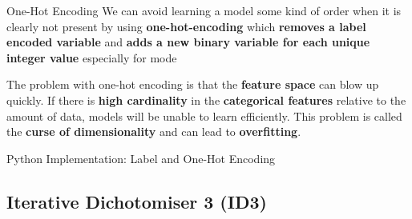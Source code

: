 \documentclass[document.tex]{subfiles}
\begin{document}
    \begin{frame}{One-Hot Encoding}
        We can avoid learning a model some kind of order when it is clearly not present by using \textbf{one-hot-encoding} which \textbf{removes a label encoded variable} and \textbf{adds a new binary variable for each unique integer value} especially for mode

        \begin{center}
            \begin{minipage}{0.4\textwidth}
                \begin{table}
                    \scalebox{0.8}{}
                \end{table}
            \end{minipage}%
            \begin{minipage}{0.6\textwidth}
                \begin{table}
                    \scalebox{0.8}{}
                \end{table}
            \end{minipage}
        \end{center}
    
        The problem with one-hot encoding is that the \textbf{feature space} can blow up quickly. If there is \textbf{high cardinality} in the \textbf{categorical features} relative to the amount of data, models will be unable to learn efficiently. This problem is called the \textbf{curse of dimensionality} and can lead to \textbf{overfitting}.
    \end{frame}
    
    \begin{frame}{Python Implementation: Label and One-Hot Encoding}
        
    \end{frame}
    
    \subsection{Iterative Dichotomiser 3 (ID3)}
    
\end{document}
